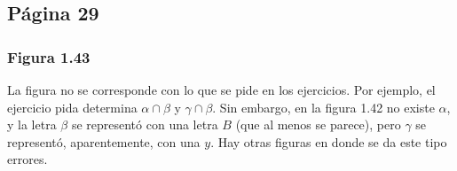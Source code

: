 







\subsection{Página 29}
\subsubsection{Figura 1.43}

La figura no se corresponde con lo que se pide en los ejercicios. Por ejemplo, el ejercicio pida determina $\alpha \cap \beta$ y $\gamma \cap \beta$. Sin embargo, en la figura 1.42 no existe $\alpha$, y la letra $\beta$ se representó con una letra $B$ (que al menos se parece), pero $\gamma$ se representó, aparentemente, con una $y$. Hay otras figuras en donde se da este tipo errores.


